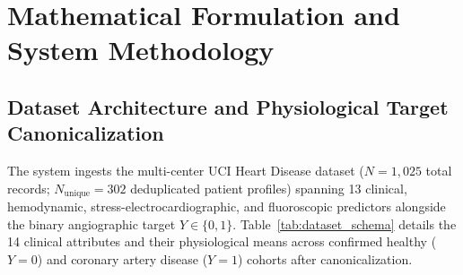 \documentclass[12pt,a4paper]{report}
\begin{document}
\chapter[Mathematical Formulation \& Methodology]{Mathematical Formulation and System Methodology}

\section{Dataset Architecture and Physiological Target Canonicalization}
The system ingests the multi-center UCI Heart Disease dataset ($N = 1,025$ total records; $N_{\text{unique}} = 302$ deduplicated patient profiles) spanning 13 clinical, hemodynamic, stress-electrocardiographic, and fluoroscopic predictors alongside the binary angiographic target $Y \in \{0, 1\}$. Table~\ref{tab:dataset_schema} details the 14 clinical attributes and their physiological means across confirmed healthy ($Y=0$) and coronary artery disease ($Y=1$) cohorts after canonicalization.
\end{document}
